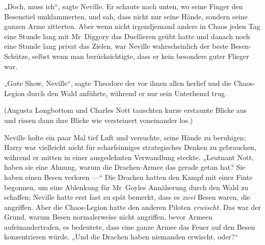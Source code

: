 „Doch, muss ich“, sagte Neville. Er schaute nach unten, wo seine Finger den Besenstiel umklammerten, und sah, dass nicht nur seine Hände, sondern seine ganzen Arme zitterten. Aber wenn nicht irgendjemand anders in Chaos jeden Tag eine Stunde lang mit Mr~Diggory das Duellieren geübt hatte und danach noch eine Stunde lang privat das Zielen, war Neville wahrscheinlich der beste Besen-Schütze, selbst wenn man berücksichtigte, dass er kein besonders guter Flieger war.

„Gute Show, Neville“, sagte Theodore der vor ihnen allen herlief und die Chaos-Legion durch den Wald anführte, während er nur sein Unterhemd trug.

(Augusta Longbottom und Charles Nott tauschten kurze erstaunte Blicke aus und rissen dann ihre Blicke wie versteinert voneinander los.)

Neville holte ein paar Mal tief Luft und versuchte, seine Hände zu beruhigen; Harry war vielleicht nicht für scharfsinniges strategisches Denken zu gebrauchen, während er mitten in einer ausgedehnten Verwandlung steckte.
„Leutnant Nott, haben sie eine Ahnung, warum die Drachen-Armee das gerade getan hat? Sie haben einen Besen verloren —“ Die Drachen hatten den Kampf mit einer Finte begonnen, um eine Ablenkung für Mr~Goyles Annäherung durch den Wald zu schaffen; Neville hatte erst fast zu spät bemerkt, dass es \emph{zwei} Besen waren, die angriffen. Aber die Chaos-Legion hatte den anderen Piloten \emph{erwischt}. Das war der Grund, warum Besen normalerweise nicht angriffen, bevor Armeen aufeinandertrafen, es bedeutete, dass eine ganze Armee das Feuer auf den Besen konzentrieren würde.
„Und die Drachen haben niemanden erwischt, oder?“

